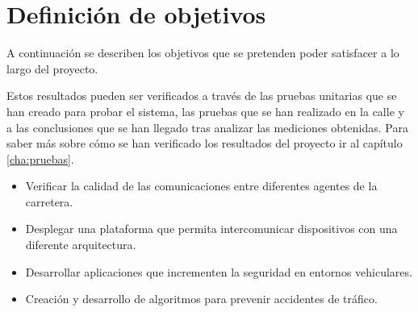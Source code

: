 \chapter{Definición de objetivos}
A continuación se describen los objetivos que se pretenden poder satisfacer a lo largo del proyecto.

Estos resultados pueden ser verificados a través de las pruebas unitarias que se han creado para probar el sistema, las pruebas que se han realizado en la calle y a las conclusiones que se han llegado tras analizar las mediciones obtenidas. Para saber más sobre cómo se han verificado los resultados del proyecto ir al capítulo \ref{cha:pruebas}.


\begin{itemize}
	\item Verificar la calidad de las comunicaciones entre diferentes agentes de la carretera.
	\item Desplegar una plataforma que permita intercomunicar dispositivos con una diferente arquitectura.
	\item Desarrollar aplicaciones que incrementen la seguridad en entornos vehiculares.
	\item Creación y desarrollo de algoritmos para prevenir accidentes de tráfico.
\end{itemize}